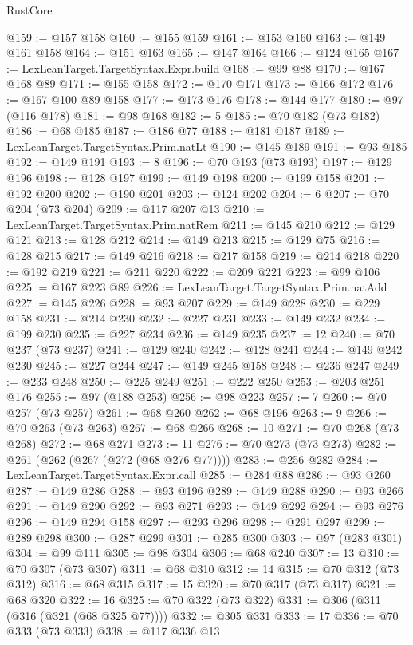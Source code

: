 \begin{lexlean}{RustCore}
\begin{coremodule}
@159 := @157 @158
@160 := @155 @159
@161 := @153 @160
@163 := @149 @161 @158
@164 := @151 @163
@165 := @147 @164
@166 := @124 @165
@167 := LexLeanTarget.TargetSyntax.Expr.build
@168 := @99 @88
@170 := @167 @168 @89
@171 := @155 @158
@172 := @170 @171
@173 := @166 @172
@176 := @167 @100 @89 @158
@177 := @173 @176
@178 := @144 @177
@180 := @97 (@116 @178)
@181 := @98 @168
@182 := 5
@185 := @70 @182 (@73 @182)
@186 := @68 @185
@187 := @186 @77
@188 := @181 @187
@189 := LexLeanTarget.TargetSyntax.Prim.natLt
@190 := @145 @189
@191 := @93 @185
@192 := @149 @191
@193 := 8
@196 := @70 @193 (@73 @193)
@197 := @129 @196
@198 := @128 @197
@199 := @149 @198
@200 := @199 @158
@201 := @192 @200
@202 := @190 @201
@203 := @124 @202
@204 := 6
@207 := @70 @204 (@73 @204)
@209 := @117 @207 @13
@210 := LexLeanTarget.TargetSyntax.Prim.natRem
@211 := @145 @210
@212 := @129 @121
@213 := @128 @212
@214 := @149 @213
@215 := @129 @75
@216 := @128 @215
@217 := @149 @216
@218 := @217 @158
@219 := @214 @218
@220 := @192 @219
@221 := @211 @220
@222 := @209 @221
@223 := @99 @106
@225 := @167 @223 @89
@226 := LexLeanTarget.TargetSyntax.Prim.natAdd
@227 := @145 @226
@228 := @93 @207
@229 := @149 @228
@230 := @229 @158
@231 := @214 @230
@232 := @227 @231
@233 := @149 @232
@234 := @199 @230
@235 := @227 @234
@236 := @149 @235
@237 := 12
@240 := @70 @237 (@73 @237)
@241 := @129 @240
@242 := @128 @241
@244 := @149 @242 @230
@245 := @227 @244
@247 := @149 @245 @158
@248 := @236 @247
@249 := @233 @248
@250 := @225 @249
@251 := @222 @250
@253 := @203 @251 @176
@255 := @97 (@188 @253)
@256 := @98 @223
@257 := 7
@260 := @70 @257 (@73 @257)
@261 := @68 @260
@262 := @68 @196
@263 := 9
@266 := @70 @263 (@73 @263)
@267 := @68 @266
@268 := 10
@271 := @70 @268 (@73 @268)
@272 := @68 @271
@273 := 11
@276 := @70 @273 (@73 @273)
@282 := @261 (@262 (@267 (@272 (@68 @276 @77))))
@283 := @256 @282
@284 := LexLeanTarget.TargetSyntax.Expr.call
@285 := @284 @88
@286 := @93 @260
@287 := @149 @286
@288 := @93 @196
@289 := @149 @288
@290 := @93 @266
@291 := @149 @290
@292 := @93 @271
@293 := @149 @292
@294 := @93 @276
@296 := @149 @294 @158
@297 := @293 @296
@298 := @291 @297
@299 := @289 @298
@300 := @287 @299
@301 := @285 @300
@303 := @97 (@283 @301)
@304 := @99 @111
@305 := @98 @304
@306 := @68 @240
@307 := 13
@310 := @70 @307 (@73 @307)
@311 := @68 @310
@312 := 14
@315 := @70 @312 (@73 @312)
@316 := @68 @315
@317 := 15
@320 := @70 @317 (@73 @317)
@321 := @68 @320
@322 := 16
@325 := @70 @322 (@73 @322)
@331 := @306 (@311 (@316 (@321 (@68 @325 @77))))
@332 := @305 @331
@333 := 17
@336 := @70 @333 (@73 @333)
@338 := @117 @336 @13

\end{coremodule}
\end{lexlean}
